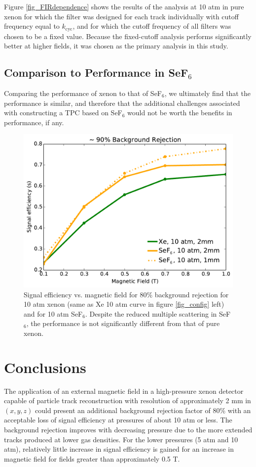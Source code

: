 \documentclass{JINST}
\begin{document}
Figure \ref{fig_FIRdependence} shows the results of the analysis at 10 atm in pure xenon for which
the filter was designed for each track individually with cutoff frequency equal to $k_{\mathrm{cyc}}$, and for which the 
cutoff frequency of all filters was chosen to be a fixed value.  Because the fixed-cutoff analysis performs significantly better
at higher fields, it was chosen as the primary analysis in this study.

\subsection{Comparison to Performance in SeF$_6$}
Comparing the performance of xenon to that of SeF$_6$, we ultimately find that the performance is similar, and
therefore that the additional challenges associated with constructing a TPC based on SeF$_6$ would not be worth
the benefits in performance, if any.

\begin{figure}[!htb]
	\centering
	\includegraphics[scale=0.43]{fig/eff_vs_b_xe_sef6_90.pdf}
	\caption{\label{fig_xevssef6}Signal efficiency vs. magnetic field for 80\% background rejection for 10 atm xenon (same as Xe 10 atm curve in figure \protect\ref{fig_config} left) and for 10 atm SeF$_6$.  Despite the reduced multiple scattering in SeF$_6$, the performance is not significantly different from that of pure xenon.}
\end{figure}

\section{Conclusions}
The application of an external magnetic field in a high-pressure xenon detector capable of particle track reconstruction with resolution of approximately 2 mm in $(x,y,z)$ could present an additional background rejection factor of 80\% with an acceptable loss of signal efficiency at pressures of about 10 atm or less.  The background rejection improves with decreasing pressure due to the more extended tracks produced at lower gas densities.  For the lower pressures (5 atm and 10 atm), relatively little increase in signal efficiency is gained for an increase in magnetic field for fields greater than approximately 0.5 T.
\end{document}
